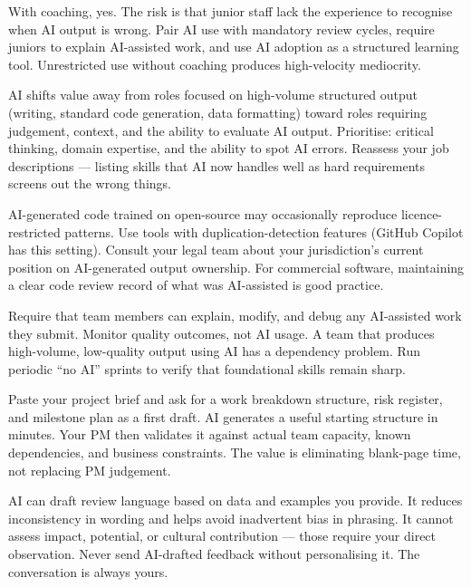 {With coaching, yes.
The risk is that junior staff lack the experience to recognise when AI output is wrong.
Pair AI use with mandatory review cycles, require juniors to explain AI-assisted work,
and use AI adoption as a structured learning tool.
Unrestricted use without coaching produces high-velocity mediocrity.}

{AI shifts value away from roles focused on high-volume structured output (writing,
standard code generation, data formatting) toward roles requiring judgement, context,
and the ability to evaluate AI output.
Prioritise: critical thinking, domain expertise, and the ability to spot AI errors.
Reassess your job descriptions --- listing skills that AI now handles well as hard
requirements screens out the wrong things.}

{AI-generated code trained on open-source may occasionally reproduce licence-restricted
patterns.
Use tools with duplication-detection features (GitHub Copilot has this setting).
Consult your legal team about your jurisdiction's current position on AI-generated
output ownership.
For commercial software, maintaining a clear code review record of what was AI-assisted
is good practice.}

{Require that team members can explain, modify, and debug any AI-assisted work they
submit.
Monitor quality outcomes, not AI usage.
A team that produces high-volume, low-quality output using AI has a dependency
problem.
Run periodic ``no AI'' sprints to verify that foundational skills remain sharp.}

{Paste your project brief and ask for a work breakdown structure, risk register, and
milestone plan as a first draft.
AI generates a useful starting structure in minutes.
Your PM then validates it against actual team capacity, known dependencies, and
business constraints.
The value is eliminating blank-page time, not replacing PM judgement.}

{AI can draft review language based on data and examples you provide.
It reduces inconsistency in wording and helps avoid inadvertent bias in phrasing.
It cannot assess impact, potential, or cultural contribution --- those require your
direct observation.
Never send AI-drafted feedback without personalising it.
The conversation is always yours.}

